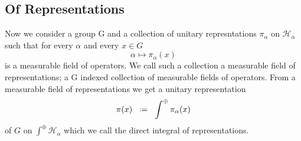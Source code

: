 \documentclass[10pt, openany]{book}
\numberwithin{equation}{section}
\theoremstyle{definition}
\theoremstyle{remark}
\numberwithin{equation}{section}
\begin{document}
    \subsection{Of Representations}
    Now we consider a group G and a collection of unitary represntations \(\pi_\alpha\) on \(\mathcal{H}_\alpha\) such that for every \(\alpha\)  and every \(x\in G\)
    \[\alpha \mapsto \pi_\alpha(x)\]
    is a measurable field of operators. We call such a collection a measurable field of representations; a G indexed collection of measurable fields of operators. From a measurable field of representations we get a unitary representation 
    \[\pi(x) \defeq \int^\oplus \pi_\alpha(x)\]
    of \(G\) on \(\int^\oplus \mathcal{H}_\alpha\) which we call the direct integral of representations. 




\listoftodos
{}


\newpage


\end{document}
